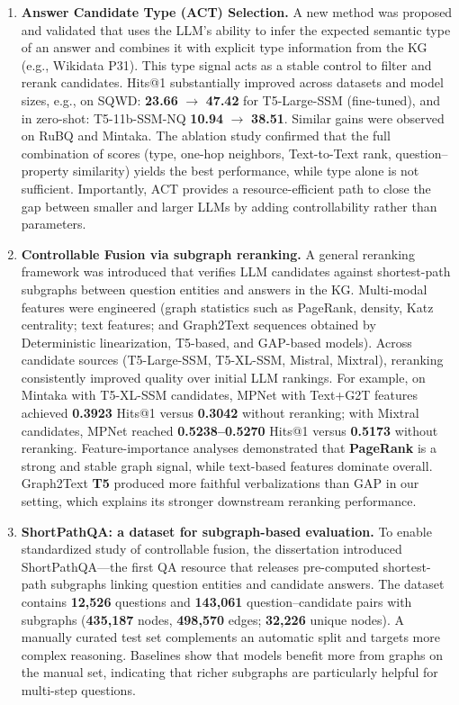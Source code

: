 \begin{enumerate}
    \item \textbf{Answer Candidate Type (ACT) Selection.} A new method was proposed and validated that uses the LLM's ability to infer the expected semantic type of an answer and combines it with explicit type information from the KG (e.g., Wikidata P31). This type signal acts as a stable control to filter and rerank candidates. Hits@1 substantially improved across datasets and model sizes, e.g., on SQWD: \textbf{23.66} $\to$ \textbf{47.42} for T5-Large-SSM (fine-tuned), and in zero-shot: T5-11b-SSM-NQ \textbf{10.94} $\to$ \textbf{38.51}. Similar gains were observed on RuBQ and Mintaka. The ablation study confirmed that the full combination of scores (type, one-hop neighbors, Text-to-Text rank, question–property similarity) yields the best performance, while type alone is not sufficient. Importantly, ACT provides a resource-efficient path to close the gap between smaller and larger LLMs by adding controllability rather than parameters.
    
    \item \textbf{Controllable Fusion via subgraph reranking.} A general reranking framework was introduced that verifies LLM candidates against shortest-path subgraphs between question entities and answers in the KG. Multi-modal features were engineered (graph statistics such as PageRank, density, Katz centrality; text features; and Graph2Text sequences obtained by Deterministic linearization, T5-based, and GAP-based models). Across candidate sources (T5-Large-SSM, T5-XL-SSM, Mistral, Mixtral), reranking consistently improved quality over initial LLM rankings. For example, on Mintaka with T5-XL-SSM candidates, MPNet with Text+G2T features achieved \textbf{0.3923} Hits@1 versus \textbf{0.3042} without reranking; with Mixtral candidates, MPNet reached \textbf{0.5238--0.5270} Hits@1 versus \textbf{0.5173} without reranking. Feature-importance analyses demonstrated that \textbf{PageRank} is a strong and stable graph signal, while text-based features dominate overall. Graph2Text \textbf{T5} produced more faithful verbalizations than GAP in our setting, which explains its stronger downstream reranking performance.
    
    \item \textbf{ShortPathQA: a dataset for subgraph-based evaluation.} To enable standardized study of controllable fusion, the dissertation introduced ShortPathQA—the first QA resource that releases pre-computed shortest-path subgraphs linking question entities and candidate answers. The dataset contains \textbf{12,526} questions and \textbf{143,061} question–candidate pairs with subgraphs (\textbf{435,187} nodes, \textbf{498,570} edges; \textbf{32,226} unique nodes). A manually curated test set complements an automatic split and targets more complex reasoning. Baselines show that models benefit more from graphs on the manual set, indicating that richer subgraphs are particularly helpful for multi-step questions.
    

\end{enumerate}
